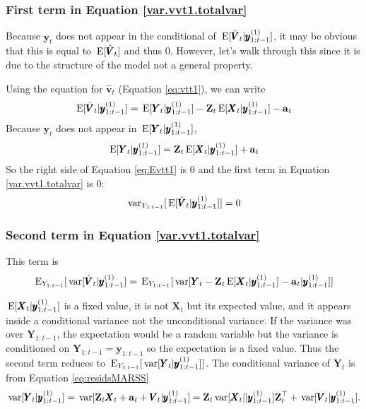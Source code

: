 \documentclass[]{article}
\def\XI{\mbox{\boldmath $\Xi$}}
\def\E{\,\textup{\textrm{E}}}
\def\VV{\mbox{$\pmb{V}$}}	\def\vv{\mbox{$\pmb{v}$}}
\def\XX{\mbox{$\pmb{X}$}}	\def\xx{\mbox{$\pmb{x}$}}
\def\YY{\mbox{$\pmb{Y}$}}	\def\yy{\mbox{$\pmb{y}$}}
\def\ZZ{\mbox{$\mathbf Z$}}	\def\zz{\mbox{$\mathbf z$}}	\def\Zb{\mbox{$\mathbf M$}} \def\Za{\mbox{$\mathbf N$}} \def\Zm{\XI}
\def\var{\,\textup{\textrm{var}}}
\begin{document}
\subsubsection{First term in Equation \ref{var.vvt1.totalvar}}

Because $\yy_t$ does not appear in the conditional of $\E[\hat{\VV}_t|\yy^{(1)}_{1:t-1}]$, it may be obvious that this is equal to $\E[\hat{\VV}_t]$ and thus 0. However, let's walk through this since it is due to the structure of the model not a general property.

Using the equation for $\hat{\vv}_t$ (Equation \ref{eq:vtt1}), we can write
\begin{equation}\label{eq:Evtt1}
\E[\hat{\VV}_t|\yy^{(1)}_{1:t-1}]=\E[\YY_t|\yy^{(1)}_{1:t-1}] - \ZZ_t\E[\XX_t|\yy^{(1)}_{1:t-1}] - \aa_t
\end{equation}
Because $\yy_t$ does not appear in $\E[\YY_t|\yy^{(1)}_{1:t-1}]$,
\begin{equation}
\E[\YY_t|\yy^{(1)}_{1:t-1}] = \ZZ_t\E[\XX_t|\yy^{(1)}_{1:t-1}] + \aa_t
\end{equation}
So the right side of Equation \ref{eq:Evtt1} is 0 and the first term in Equation \ref{var.vvt1.totalvar} is 0:
\begin{equation}
\var_{Y_{1:t-1}}[\E[\hat{\VV}_t|\yy^{(1)}_{1:t-1}]] = 0
\end{equation}

\subsubsection{Second term in Equation \ref{var.vvt1.totalvar}}

This term is 
\begin{equation}
\E_{Y_{1:t-1}}[\var[\hat{\VV}_t|\yy^{(1)}_{1:t-1}] =
\E_{Y_{1:t-1}}[\var[\YY_t-\ZZ_t\E[\XX_t|\yy^{(1)}_{1:t-1}]-\aa_t|\yy^{(1)}_{1:t-1}]]
\end{equation}

$\E[\XX_t|\yy^{(1)}_{1:t-1}]$ is a fixed value, it is not $\XX_t$ but its expected value, and it appears inside a conditional variance not the unconditional variance. If the variance was over $\YY_{1:t-1}$, the expectation would be a random variable but the variance is conditioned on $\YY_{1:t-1}=\yy_{1:t-1}$ so the expectation is a fixed value.  Thus the second term reduces to $\E_{Y_{1:t-1}}[\var[\YY_t|\yy^{(1)}_{1:t-1}]]$. The conditional variance of $\YY_t$ is from Equation \ref{eq:residsMARSS}
\begin{equation}
\var[\YY_t|\yy^{(1)}_{1:t-1}] = \var[\ZZ_t \XX_t + \aa_t + \VV_t|\yy^{(1)}_{1:t-1}] \\
= \ZZ_t \var[\XX_t||\yy^{(1)}_{1:t-1}] \ZZ_t^\top + \var[\VV_t|\yy^{(1)}_{1:t-1}].
\end{equation}
\end{document}
